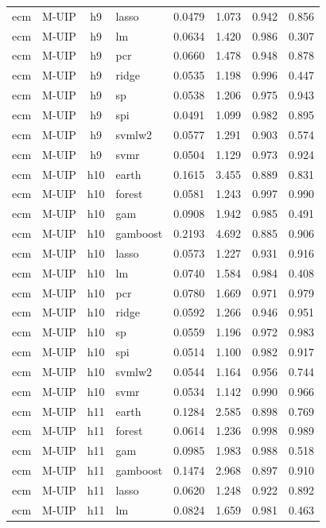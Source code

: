 \begin{ThreePartTable}
\begin{longtable}[t]{llclcccc}
ecm & M-UIP & h9 & lasso & 0.0479 & 1.073 & 0.942 & 0.856\\
ecm & M-UIP & h9 & lm & 0.0634 & 1.420 & 0.986 & 0.307\\
ecm & M-UIP & h9 & pcr & 0.0660 & 1.478 & 0.948 & 0.878\\
ecm & M-UIP & h9 & ridge & 0.0535 & 1.198 & 0.996 & 0.447\\
ecm & M-UIP & h9 & sp & 0.0538 & 1.206 & 0.975 & 0.943\\
ecm & M-UIP & h9 & spi & 0.0491 & 1.099 & 0.982 & 0.895\\
ecm & M-UIP & h9 & svmlw2 & 0.0577 & 1.291 & 0.903 & 0.574\\
ecm & M-UIP & h9 & svmr & 0.0504 & 1.129 & 0.973 & 0.924\\
\addlinespace
ecm & M-UIP & h10 & earth & 0.1615 & 3.455 & 0.889 & 0.831\\
ecm & M-UIP & h10 & forest & 0.0581 & 1.243 & 0.997 & 0.990\\
ecm & M-UIP & h10 & gam & 0.0908 & 1.942 & 0.985 & 0.491\\
ecm & M-UIP & h10 & gamboost & 0.2193 & 4.692 & 0.885 & 0.906\\
ecm & M-UIP & h10 & lasso & 0.0573 & 1.227 & 0.931 & 0.916\\
ecm & M-UIP & h10 & lm & 0.0740 & 1.584 & 0.984 & 0.408\\
ecm & M-UIP & h10 & pcr & 0.0780 & 1.669 & 0.971 & 0.979\\
ecm & M-UIP & h10 & ridge & 0.0592 & 1.266 & 0.946 & 0.951\\
ecm & M-UIP & h10 & sp & 0.0559 & 1.196 & 0.972 & 0.983\\
ecm & M-UIP & h10 & spi & 0.0514 & 1.100 & 0.982 & 0.917\\
ecm & M-UIP & h10 & svmlw2 & 0.0544 & 1.164 & 0.956 & 0.744\\
ecm & M-UIP & h10 & svmr & 0.0534 & 1.142 & 0.990 & 0.966\\
\addlinespace
ecm & M-UIP & h11 & earth & 0.1284 & 2.585 & 0.898 & 0.769\\
ecm & M-UIP & h11 & forest & 0.0614 & 1.236 & 0.998 & 0.989\\
ecm & M-UIP & h11 & gam & 0.0985 & 1.983 & 0.988 & 0.518\\
ecm & M-UIP & h11 & gamboost & 0.1474 & 2.968 & 0.897 & 0.910\\
ecm & M-UIP & h11 & lasso & 0.0620 & 1.248 & 0.922 & 0.892\\
ecm & M-UIP & h11 & lm & 0.0824 & 1.659 & 0.981 & 0.463\\

\end{longtable}
\end{ThreePartTable}
